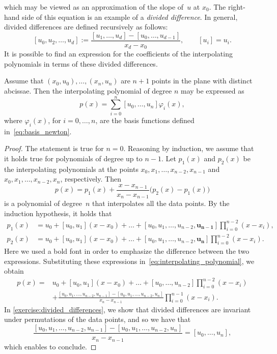 which may be viewed as an approximation of the slope of~$u$ at $x_0$.
The right-hand side of this equation is an example of a \emph{divided difference}.
In general, divided differences are defined recursively as follows:
\begin{equation}
    \label{eq:definition_divided_difference}
    [u_{0}, u_{2}, \dotsc, u_{d}] := \frac{[u_{1}, \dotsc, u_{d}] - [u_{0}, \dotsc, u_{d-1}]}{x_{d}-x_{0}}, \qquad [u_i] = u_i.
\end{equation}
It is possible to find an expression for the coefficients of the interpolating polynomials in terms of these divided differences.
\begin{proposition}
    Assume that $(x_0, u_0), \dotsc, (x_n, u_n)$ are $n+1$ points in the plane with distinct abcissae.
    Then the interpolating polynomial of degree $n$ may be expressed as
    \[
        p(x) = \sum_{i=0}^{n} [u_0, \dotsc, u_n] \varphi_i(x),
    \]
    where $\varphi_i(x)$, for $i = 0, \dotsc, n$, are the basis functions defined in~\eqref{eq:basis_newton}.
\end{proposition}
\begin{proof}
    The statement is true for $n = 0$.
    Reasoning by induction, we assume that it holds true for polynomials of degree up to $n-1$.
    Let $p_1(x)$ and $p_2(x)$ be the interpolating polynomials at the points
    $x_0, x_1, \dotsc, x_{n-2}, x_{n-1}$ and $x_0, x_1, \dotsc, x_{n-2}, x_{n}$, respectively.
    Then
    \begin{equation}
        \label{eq:interpolating_polynomial}
        p(x) = p_1(x) + \frac{x - x_{n-1}}{x_n - x_{n-1}} \bigl(p_2(x) - p_1(x)\bigr)
    \end{equation}
    is a polynomial of degree~$n$ that interpolates all the data points.
    By the induction hypothesis,
    it holds that
    \begin{align*}
        p_1(x) &= u_0 + [u_0, u_1] (x - x_0) + \dotsc + [u_0, u_1, \dotsc, u_{n-2}, \mathbf{u_{n-1}}] \prod_{i=0}^{n-2} (x - x_i), \\
        p_2(x) &= u_0 + [u_0, u_1] (x - x_0) + \dotsc + [u_0, u_1, \dotsc, u_{n-2}, \mathbf{u_{n}}] \prod_{i=0}^{n-2} (x - x_i).
    \end{align*}
    Here we used a bold font in order to emphasize the difference between the two expressions.
    Substituting these expressions in~\eqref{eq:interpolating_polynomial},
    we obtain
    \begin{align*}
        p(x) =
        &u_0 + [u_0, u_1] (x - x_0) + \dotsc + [u_0, \dotsc, u_{n-2}] \prod_{i=0}^{n-2} (x - x_i)  \\
        & + \frac{[u_0, u_1, \dotsc, u_{n-2}, u_{n-1}] - [u_0, u_1, \dotsc, u_{n-2}, u_{n}]}{x_n - x_{n-1}} \prod_{i=0}^{n-1} (x - x_i).
    \end{align*}
    In \cref{exercise:divided_differences},
    we show that divided differences are invariant under permutations of the data points,
    and so we have that
    \[
        \frac{[u_0, u_1, \dotsc, u_{n-2}, u_{n-1}] - [u_0, u_1, \dotsc, u_{n-2}, u_{n}]}{x_n - x_{n-1}} = [u_0, \dotsc, u_n],
    \]
    which enables to conclude.
\end{proof}
